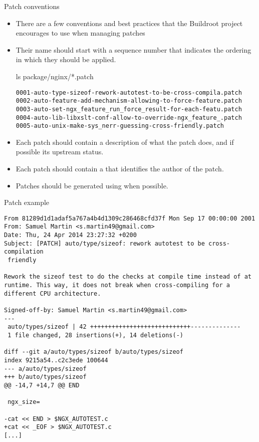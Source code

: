 \begin{frame}[fragile]{Patch conventions}
  \begin{itemize}
  \item There are a few conventions and best practices that the
    Buildroot project encourages to use when managing patches
  \item Their name should start with a sequence number that
    indicates the ordering in which they should be applied.
    \begin{block}{ls package/nginx/*.patch}
      {\scriptsize
\begin{verbatim}
0001-auto-type-sizeof-rework-autotest-to-be-cross-compila.patch
0002-auto-feature-add-mechanism-allowing-to-force-feature.patch
0003-auto-set-ngx_feature_run_force_result-for-each-featu.patch
0004-auto-lib-libxslt-conf-allow-to-override-ngx_feature_.patch
0005-auto-unix-make-sys_nerr-guessing-cross-friendly.patch
\end{verbatim}}
      \end{block}
    \item Each patch should contain a description of what the patch
      does, and if possible its upstream status.
    \item Each patch should contain a  that
      identifies the author of the patch.
    \item Patches should be generated using
       when possible.
    \end{itemize}
\end{frame}

\begin{frame}[fragile]{Patch example}

\begin{block}{}
{\tiny
\begin{verbatim}
From 81289d1d1adaf5a767a4b4d1309c286468cfd37f Mon Sep 17 00:00:00 2001
From: Samuel Martin <s.martin49@gmail.com>
Date: Thu, 24 Apr 2014 23:27:32 +0200
Subject: [PATCH] auto/type/sizeof: rework autotest to be cross-compilation
 friendly

Rework the sizeof test to do the checks at compile time instead of at
runtime. This way, it does not break when cross-compiling for a
different CPU architecture.

Signed-off-by: Samuel Martin <s.martin49@gmail.com>
---
 auto/types/sizeof | 42 ++++++++++++++++++++++++++++--------------
 1 file changed, 28 insertions(+), 14 deletions(-)

diff --git a/auto/types/sizeof b/auto/types/sizeof
index 9215a54..c2c3ede 100644
--- a/auto/types/sizeof
+++ b/auto/types/sizeof
@@ -14,7 +14,7 @@ END
 
 ngx_size=
 
-cat << END > $NGX_AUTOTEST.c
+cat << _EOF > $NGX_AUTOTEST.c
[...]
\end{verbatim}}
\end{block}

\end{frame}

